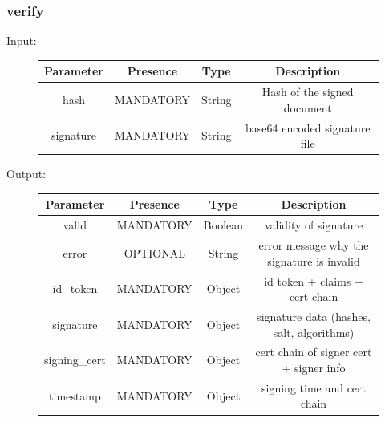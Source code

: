 \subsubsection{verify}
Input:

\begin{figure}[H]
    \begin{center}
        \begin{tabular}{c|c|c|c}
            \textbf{Parameter} & \textbf{Presence} & \textbf{Type} & \textbf{Description} \\
            \hline
            hash & MANDATORY & String & Hash of the signed document \\
            \hline
            signature & MANDATORY & String & base64 encoded signature file \\
        \end{tabular}
    \end{center}
\end{figure}

Output:

\begin{figure}[H]
    \begin{center}
        \begin{tabular}{c|c|c|c}
            \textbf{Parameter} & \textbf{Presence} & \textbf{Type} & \textbf{Description} \\
            \hline
            valid & MANDATORY & Boolean & validity of signature \\
            \hline
            error & OPTIONAL & String & error message why the signature is invalid \\
            \hline
            id\_token & MANDATORY & Object & id token + claims + cert chain \\
            \hline
            signature & MANDATORY & Object & signature data (hashes, salt, algorithms) \\
            \hline
            signing\_cert & MANDATORY & Object & cert chain of signer cert + signer info \\
            \hline
            timestamp & MANDATORY & Object & signing time and cert chain \\
        \end{tabular}
    \end{center}
\end{figure}


